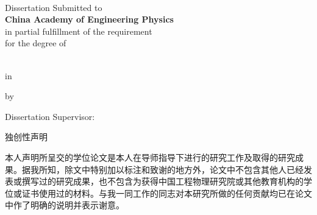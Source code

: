 \cleardoublepage

\begin{center}
  \bfseries
  \fontsize{20pt}{20pt} \selectfont
  \hspace*{\fill}\\
  \theentitle
\end{center}

\vspace{20pt}

\begin{center}
  Dissertation Submitted to\\
  \textbf{China Academy of Engineering Physics}\\
  in partial fulfillment of the requirement\\
  for the degree of\\
  \textbf{\thedgreelevelen}\\
\end{center}

\vspace{20pt}

\begin{center}
  in
  \\
  \textbf{\thefielden}
\end{center}
\vspace{20pt}
\begin{center}
  by\\
  \textbf{\theenauthor}
\end{center}

\vspace{50pt}

\begin{center}
  Dissertation Supervisor: \printsupervisoren \printsecondsupervisoren
\end{center}

\vspace{20pt}

\begin{center}
  \textbf{\thethesismonthen}
\end{center}

\cleardoublepage
\vspace{20pt}
\begin{center}
  独创性声明
\end{center}
\vspace{40pt}
\par 本人声明所呈交的学位论文是本人在导师指导下进行的研究工作及取得的研究成果。据我所知，除文中特别加以标注和致谢的地方外，论文中不包含其他人已经发表或撰写过的研究成果，也不包含为获得中国工程物理研究院或其他教育机构的学位或证书使用过的材料。与我一同工作的同志对本研究所做的任何贡献均已在论文中作了明确的说明并表示谢意。

